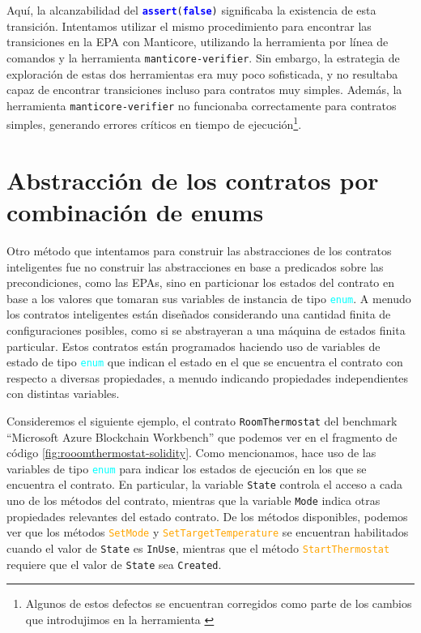 Aquí, la alcanzabilidad del \texttt{\textcolor{blue}{\textbf{assert}}(\textcolor{blue}{\textbf{false}})} significaba la existencia de esta transición.
Intentamos utilizar el mismo procedimiento para encontrar las transiciones en la EPA con Manticore, utilizando la herramienta por línea de comandos y la herramienta \texttt{manticore-verifier}.
Sin embargo, la estrategia de exploración de estas dos herramientas era muy poco sofisticada, y no resultaba capaz de encontrar transiciones incluso para contratos muy simples.
Además, la herramienta \texttt{manticore-verifier} no funcionaba correctamente para contratos simples, generando errores críticos en tiempo de ejecución\footnote{Algunos de estos defectos se encuentran corregidos como parte de los cambios que introdujimos en la herramienta \cite{manticore-tiny-changes}}.

\section{Abstracción de los contratos por combinación de enums}
Otro método que intentamos para construir las abstracciones de los contratos inteligentes fue no construir las abstracciones en base a predicados sobre las precondiciones, como las EPAs, sino en particionar los estados del contrato en base a los valores que tomaran sus variables de instancia de tipo \textcolor{cyan}{\texttt{enum}}.
A menudo los contratos inteligentes están diseñados considerando una cantidad finita de configuraciones posibles, como si se abstrayeran a una máquina de estados finita particular.
Estos contratos están programados haciendo uso de variables de estado de tipo \textcolor{cyan}{\texttt{enum}} que indican el estado en el que se encuentra el contrato con respecto a diversas propiedades, a menudo indicando propiedades independientes con distintas variables.

Consideremos el siguiente ejemplo, el contrato \texttt{RoomThermostat} del benchmark ``Microsoft Azure Blockchain Workbench'' \cite{azure-benchmark} que podemos ver en el fragmento de código \ref{fig:rooomthermostat-solidity}.
Como mencionamos, hace uso de las variables de tipo \textcolor{cyan}{\texttt{enum}} para indicar los estados de ejecución en los que se encuentra el contrato.
En particular, la variable \texttt{State} controla el acceso a cada uno de los métodos del contrato, mientras que la variable \texttt{Mode} indica otras propiedades relevantes del estado contrato.
De los métodos disponibles, podemos ver que los métodos \textcolor{orange}{\texttt{SetMode}} y \textcolor{orange}{\texttt{SetTargetTemperature}} se encuentran habilitados cuando el valor de \texttt{State} es \texttt{InUse}, mientras que el método \textcolor{orange}{\texttt{StartThermostat}} requiere que el valor de \texttt{State} sea \texttt{Created}.

